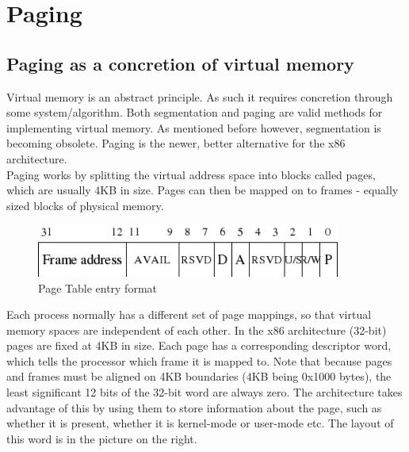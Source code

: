 \documentclass[12pt]{article}
\begin{document}
\section{Paging}
\subsection{Paging as a concretion of virtual memory}
Virtual memory is an abstract principle. As such it requires concretion through some system/algorithm. Both segmentation and paging are valid methods for implementing virtual memory. As mentioned before however, segmentation is becoming obsolete. Paging is the newer, better alternative for the x86 architecture.\\
Paging works by splitting the virtual address space into blocks called pages, which are usually 4KB in size. Pages can then be mapped on to frames - equally sized blocks of physical memory.
\begin{figure}[H]
  \centering
  \includegraphics[width=10cm]{images/paging.png}
  \caption{Page Table entry format}
\end{figure}
Each process normally has a different set of page mappings, so that virtual memory spaces are independent of each other. In the x86 architecture (32-bit) pages are fixed at 4KB in size. Each page has a corresponding descriptor word, which tells the processor which frame it is mapped to. Note that because pages and frames must be aligned on 4KB boundaries (4KB being 0x1000 bytes), the least significant 12 bits of the 32-bit word are always zero. The architecture takes advantage of this by using them to store information about the page, such as whether it is present, whether it is kernel-mode or user-mode etc. The layout of this word is in the picture on the right.
\end{document}
